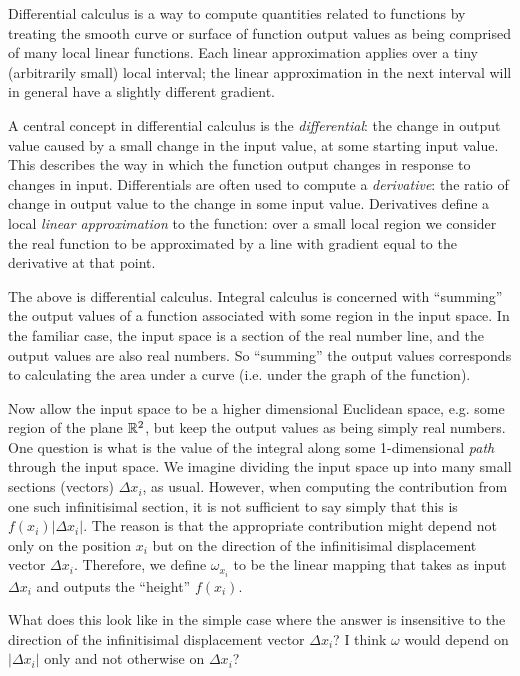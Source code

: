 \documentclass[12pt]{article}
\begin{document}
Differential calculus is a way to compute quantities related to functions by
treating the smooth curve or surface of function output values as being
comprised of many local linear functions. Each linear approximation applies
over a tiny (arbitrarily small) local interval; the linear approximation in the
next interval will in general have a slightly different gradient.

A central concept in differential calculus is the \textit{differential}: the
change in output value caused by a small change in the input value, at some
starting input value. This describes the way in which the function output
changes in response to changes in input. Differentials are often used to
compute a \textit{derivative}: the ratio of change in output value to the
change in some input value. Derivatives define a local \textit{linear
  approximation} to the function: over a small local region we consider the
real function to be approximated by a line with gradient equal to the
derivative at that point.

The above is differential calculus. Integral calculus is concerned with
``summing'' the output values of a function associated with some region in the
input space. In the familiar case, the input space is a section of the real
number line, and the output values are also real numbers. So ``summing'' the
output values corresponds to calculating the area under a curve (i.e. under the
graph of the function).

Now allow the input space to be a higher dimensional Euclidean space, e.g. some
region of the plane $\mathbb{R}^2$, but keep the output values as being simply real
numbers. One question is what is the value of the integral along some
1-dimensional \textit{path} through the input space. We imagine dividing the
input space up into many small sections (vectors) $\Delta x_i$, as
usual. However, when computing the contribution from one such infinitisimal
section, it is not sufficient to say simply that this is $f(x_i)|\Delta
x_i|$. The reason is that the appropriate contribution might depend not only on
the position $x_i$ but on the direction of the infinitisimal displacement
vector $\Delta x_i$. Therefore, we define $\omega_{x_i}$ to be the linear
mapping that takes as input $\Delta x_i$ and outputs the ``height'' $f(x_i)$.

What does this look like in the simple case where the answer is insensitive to
the direction of the infinitisimal displacement vector $\Delta x_i$? I think
$\omega$ would depend on $|\Delta x_i|$ only and not otherwise on $\Delta x_i$?
\end{document}
